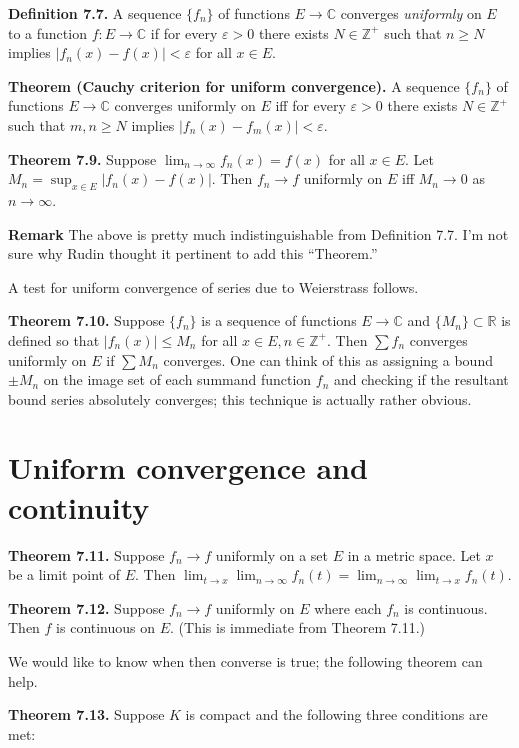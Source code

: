 \documentclass[a4paper]{article}
\newcommand{\C}{\mathbb{C}}
\newcommand{\R}{\mathbb{R}}
\newcommand{\Z}{\mathbb{Z}}
\begin{document}
\textbf{Definition 7.7.} A sequence $\{f_n\}$ of functions $E \to \C$ converges \emph{uniformly} on $E$ to a function $f : E \to \C$ if for every $\varepsilon > 0$ there exists $N \in \Z^+$ such that $n \geq N$ implies $|f_n(x) - f(x)| < \varepsilon$ for all $x \in E$.

\textbf{Theorem (Cauchy criterion for uniform convergence).} A sequence $\{f_n\}$ of functions $E \to \C$ converges uniformly on $E$ iff for every $\varepsilon > 0$ there exists $N \in \Z^+$ such that $m, n \geq N$ implies $|f_n(x) - f_m(x)| < \varepsilon$.

\textbf{Theorem 7.9.} Suppose $\displaystyle \lim_{n \to \infty} f_n(x) = f(x)$ for all $x \in E$. Let $\displaystyle M_n = \sup_{x \in E} |f_n(x) - f(x)|$. Then $f_n \to f$ uniformly on $E$ iff $M_n \to 0$ as $n \to \infty$.

\textbf{Remark} The above is pretty much indistinguishable from Definition 7.7. I'm not sure why Rudin thought it pertinent to add this ``Theorem.''

A test for uniform convergence of series due to Weierstrass follows.

\textbf{Theorem 7.10.} Suppose $\{f_n\}$ is a sequence of functions $E \to \C$ and $\{M_n\} \subset \R$ is defined so that $|f_n(x)| \leq M_n$ for all $x \in E, n \in \Z^+$. Then $\sum f_n$ converges uniformly on $E$ if $\sum M_n$ converges. One can think of this as assigning a bound $\pm M_n$ on the image set of each summand function $f_n$ and checking if the resultant bound series absolutely converges; this technique is actually rather obvious.

\section{Uniform convergence and continuity}

\textbf{Theorem 7.11.} Suppose $f_n \to f$ uniformly on a set $E$ in a metric space. Let $x$ be a limit point of $E$. Then $\displaystyle \lim_{t \to x} \lim_{n \to \infty} f_n(t) = \lim_{n \to \infty} \lim_{t \to x} f_n(t)$.

\textbf{Theorem 7.12.} Suppose $f_n \to f$ uniformly on $E$ where each $f_n$ is continuous. Then $f$ is continuous on $E$. (This is immediate from Theorem 7.11.)

We would like to know when then converse is true; the following theorem can help.

\textbf{Theorem 7.13.} Suppose $K$ is compact and the following three conditions are met:
\end{document}
